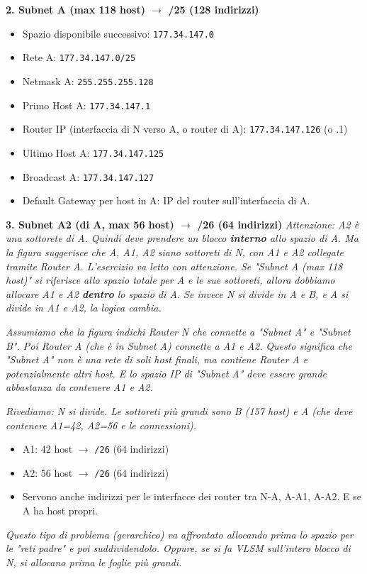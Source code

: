 \textbf{2. Subnet A (max 118 host) $\to$ /25 (128 indirizzi)}
\begin{itemize}
    \item Spazio disponibile successivo: \texttt{177.34.147.0}
    \item Rete A: \texttt{177.34.147.0/25}
    \item Netmask A: \texttt{255.255.255.128}
    \item Primo Host A: \texttt{177.34.147.1}
    \item Router IP (interfaccia di N verso A, o router di A): \texttt{177.34.147.126} (o .1)
    \item Ultimo Host A: \texttt{177.34.147.125}
    \item Broadcast A: \texttt{177.34.147.127}
    \item Default Gateway per host in A: IP del router sull'interfaccia di A.
\end{itemize}

\textbf{3. Subnet A2 (di A, max 56 host) $\to$ /26 (64 indirizzi)}
\textit{Attenzione: A2 è una sottorete di A. Quindi deve prendere un blocco \textbf{interno} allo spazio di A. Ma la figura suggerisce che A, A1, A2 siano sottoreti di N, con A1 e A2 collegate tramite Router A. L'esercizio va letto con attenzione. Se "Subnet A (max 118 host)" si riferisce allo spazio totale per A e le sue sottoreti, allora dobbiamo allocare A1 e A2 \textbf{dentro} lo spazio di A. Se invece N si divide in A e B, e A si divide in A1 e A2, la logica cambia.}

\textit{Assumiamo che la figura indichi Router N che connette a "Subnet A" e "Subnet B". Poi Router A (che è in Subnet A) connette a A1 e A2.}
\textit{Questo significa che "Subnet A" non è una rete di soli host finali, ma contiene Router A e potenzialmente altri host. E lo spazio IP di "Subnet A" deve essere grande abbastanza da contenere A1 e A2.}

\textit{Rivediamo: N si divide. Le sottoreti più grandi sono B (157 host) e A (che deve contenere A1=42, A2=56 e le connessioni).}
\begin{itemize}
    \item A1: 42 host $\to$ \texttt{/26} (64 indirizzi)
    \item A2: 56 host $\to$ \texttt{/26} (64 indirizzi)
    \item Servono anche indirizzi per le interfacce dei router tra N-A, A-A1, A-A2. E se A ha host propri.
\end{itemize}
\textit{Questo tipo di problema (gerarchico) va affrontato allocando prima lo spazio per le "reti padre" e poi suddividendolo. Oppure, se si fa VLSM sull'intero blocco di N, si allocano prima le foglie più grandi.}

